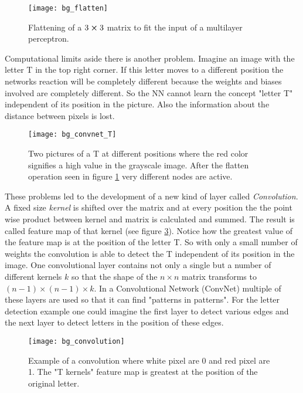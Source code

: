 \begin{figure}[H]
    \centering
    \texttt{[image: bg\_flatten]}
    \caption{Flattening of a $3\cp3$ matrix to fit the input of a multilayer perceptron.}
    \label{fig:bg:flatten}
\end{figure}

Computational limits aside there is another problem. Imagine an image with the letter T in the top right corner. If this letter moves to a different position the networks reaction will be completely different because the weights and biases involved are completely different. So the NN cannot learn the concept "letter T" independent of its position in the picture. Also the information about the distance between pixels is lost.

\begin{figure}[H]
    \centering
    \texttt{[image: bg\_convnet\_T]}
    \caption{Two pictures of a T at different positions where the red color signifies a high value in the grayscale image. After the flatten operation seen in figure \ref{fig:bg:flatten} very different nodes are active.}
    \label{fig:bg:convnet_T}
\end{figure}

These problems led to the development of a new kind of layer called \textit{Convolution}. A fixed size \textit{kernel} is shifted over the matrix and at every position the the point wise product between kernel and matrix is calculated and summed. The result is called feature map of that kernel (see figure \ref{fig:bg:convolution}). Notice how the greatest value of the feature map is at the position of the letter T. So with only a small number of weights the convolution is able to detect the T independent of its position in the image. One convolutional layer contains not only a single but a number of different kernels $k$ so that the shape of the $n \times n$ matrix transforms to $(n-1) \times (n-1) \times k$. In a Convolutional Network (ConvNet) multiple of these layers are used so that it can find "patterns in patterns". For the letter detection example one could imagine the first layer to detect various edges and the next layer to detect letters in the position of these edges.

\begin{figure}[H]
    \centering
    \texttt{[image: bg\_convolution]}
    \caption{Example of a convolution where white pixel are 0 and red pixel are 1. The "T kernels" feature map is greatest at the position of the original letter.}
    \label{fig:bg:convolution}
\end{figure}

